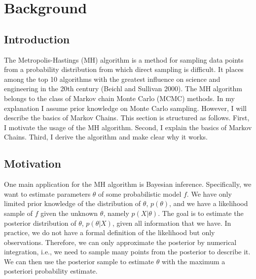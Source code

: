 \documentclass[12pt,english,a4paper,oneside]{article}
\theoremstyle{definition}
\theoremstyle{definition}
\theoremstyle{definition}
\theoremstyle{definition}
\theoremstyle{remark}
\begin{document}
\newpage







{
\setcounter{tocdepth}{2}
\newpage
{}
\tableofcontents
}

\newpage
{}
\pagestyle{plain}
\hypertarget{background}{%
\section{Background}\label{background}}

\hypertarget{introduction}{%
\subsection{Introduction}\label{introduction}}

The Metropolis-Hastings (MH) algorithm is a method for sampling data points from a probability distribution from which direct sampling is difficult. It places among the top 10 algorithms with the greatest influence on science and engineering in the 20th century (Beichl and Sullivan 2000). The MH algorithm belongs to the class of Markov chain Monte Carlo (MCMC) methods. In my explanation I assume prior knowledge on Monte Carlo sampling. However, I will describe the basics of Markov Chains. This section is structured as follows. First, I motivate the usage of the MH algorithm. Second, I explain the basics of Markov Chains. Third, I derive the algorithm and make clear why it works.

\hypertarget{motivation}{%
\subsection{Motivation}\label{motivation}}

One main application for the MH algorithm is Bayesian inference. Specifically, we want to estimate parameters \(\theta\) of some probabilistic model \(f\). We have only limited prior knowledge of the distribution of \(\theta\), \(p(\theta)\), and we have a likelihood sample of \(f\) given the unknown \(\theta\), namely \(p(X|\theta)\). The goal is to estimate the posterior distribution of \(\theta\), \(p(\theta|X)\), given all information that we have. In practice, we do not have a formal definition of the likelihood but only observations. Therefore, we can only approximate the posterior by numerical integration, i.e., we need to sample many points from the posterior to describe it. We can then use the posterior sample to estimate \(\theta\) with the maximum a posteriori probability estimate.\newline
\end{document}
